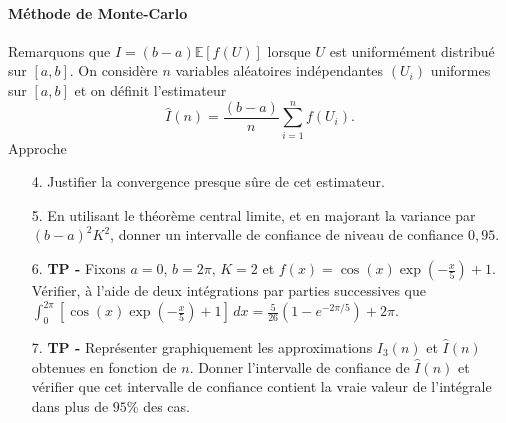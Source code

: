 \documentclass[solutions]{exercices}
\begin{document}
\begin{exercice}
\paragraph{Méthode de Monte-Carlo}$ $
 \\
Remarquons que $I=(b-a)\mathbb{E}[f(U)]$ lorsque $U$ est uniformément distribué sur $[a,b]$. On considère $n$ variables al\'eatoires ind\'ependantes $(U_i)$ uniformes sur $[a,b]$ et on définit l'estimateur
$$\hat{I}(n)=\frac{(b-a)}{n}\sum_{i=1}^n f(U_i). $$Approche
\begin{enumerate}
\item[4.] Justifier la convergence presque sûre de cet estimateur.
\item[5.] En utilisant le théorème central limite, et en majorant la variance par $(b-a)^2K^2$, donner un intervalle de confiance de niveau de confiance $0,95$.
\item[6.]
 \textbf{TP -} Fixons $a=0$, $b=2\pi$, $K=2$ et
$f(x)=\cos(x)\exp(-\frac{x}{5})+1.$
Vérifier, à l'aide de deux intégrations par parties successives que
$\int_0^{2\pi}\left[ \cos(x)\exp(-\frac{x}{5})+1 \right]\, dx =\frac{5}{26}\left(1-e^{-2\pi/5}\right) + 2\pi.$
\item[7.]\textbf{TP -}
  Repr\'esenter graphiquement les
approximations $I_3(n)$ et $\hat{I}(n)$ obtenues en fonction de $n$.
Donner l'intervalle de confiance de $\hat{I}(n)$ et vérifier que cet intervalle de confiance contient la vraie valeur de l'intégrale dans plus de $95\%$ des cas.
\end{enumerate}
\end{exercice}
\end{document}
